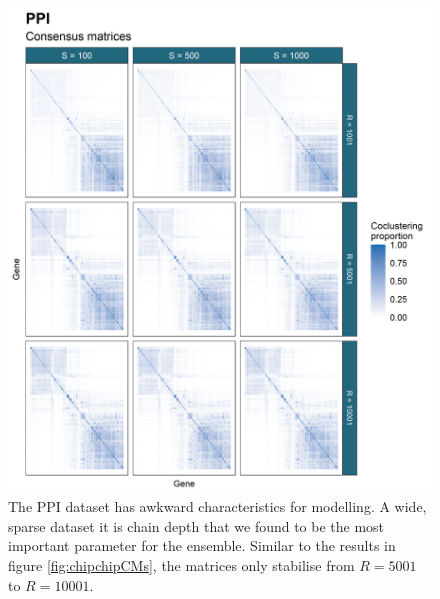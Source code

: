 \documentclass[]{article}
\begin{document}
\begin{figure}
	\centering
	\includegraphics[scale=0.8]{./Images/Yeast/PPICMcomparison.png}
	\caption{The PPI dataset has awkward characteristics for modelling. A wide, sparse dataset it is chain depth that we found to be the most important parameter for the ensemble. Similar to the results in figure \ref{fig:chipchipCMs}, the matrices only stabilise from $R=5001$ to $R=10001$.}
	\label{fig:ppiCMs}
\end{figure}
\end{document}
